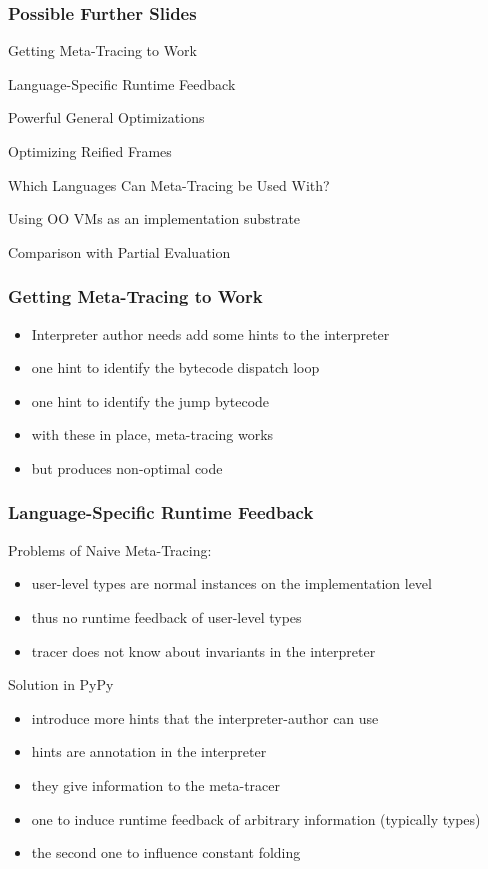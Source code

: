 \documentclass[utf8x]{beamer}
\begin{document}
\begin{frame}
  \frametitle{Possible Further Slides}
  \hyperlink{necessary-hints}{\beamergotobutton{}} Getting Meta-Tracing to Work

  \hyperlink{feedback}{\beamergotobutton{}} Language-Specific Runtime Feedback

  \hyperlink{optimizations}{\beamergotobutton{}} Powerful General Optimizations

  \hyperlink{virtualizables}{\beamergotobutton{}} Optimizing Reified Frames

  \hyperlink{which-langs}{\beamergotobutton{}} Which Languages Can Meta-Tracing be Used With?

  \hyperlink{OOVM}{\beamergotobutton{}} Using OO VMs as an implementation substrate

  \hyperlink{PE}{\beamergotobutton{}} Comparison with Partial Evaluation

\end{frame}

\begin{frame}[label=necessary-hints]
  \frametitle{Getting Meta-Tracing to Work}
  \begin{itemize}
      \item Interpreter author needs add some hints to the interpreter
      \item one hint to identify the bytecode dispatch loop
      \item one hint to identify the jump bytecode
      \item with these in place, meta-tracing works
      \item but produces non-optimal code
  \end{itemize}
\end{frame}


\begin{frame}[label=feedback]
  \frametitle{Language-Specific Runtime Feedback}
  Problems of Naive Meta-Tracing:
  \begin{itemize}
      \item user-level types are normal instances on the implementation level
      \item thus no runtime feedback of user-level types
      \item tracer does not know about invariants in the interpreter
  \end{itemize}
  \pause
  \begin{block}{Solution in PyPy}
      \begin{itemize}
          \item introduce more hints that the interpreter-author can use
          \item hints are annotation in the interpreter
          \item they give information to the meta-tracer
          \pause
          \item one to induce runtime feedback of arbitrary information (typically types)
          \item the second one to influence constant folding
      \end{itemize}
  \end{block}
\end{frame}
\end{document}
